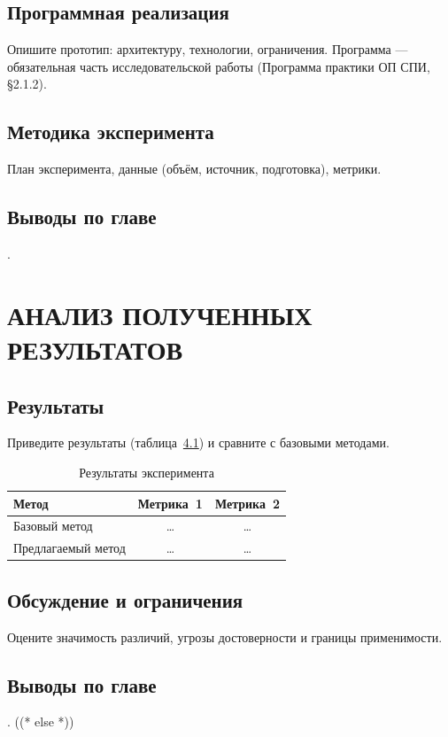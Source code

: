 \documentclass[12pt,a4paper]{extreport}
\begin{document}
\section{Программная реализация}
Опишите прототип: архитектуру, технологии, ограничения. Программа --- обязательная
часть исследовательской работы (Программа практики ОП СПИ, §2.1.2).

\section{Методика эксперимента}
План эксперимента, данные (объём, источник, подготовка), метрики.

\section{Выводы по главе}
.

\clearpage
\chapter{АНАЛИЗ ПОЛУЧЕННЫХ РЕЗУЛЬТАТОВ}
\section{Результаты}
Приведите результаты (таблица~\ref{tab:results}) и сравните с базовыми методами.

\begin{table}[H]
\caption{Результаты эксперимента}
\label{tab:results}
\centering
\begin{tabular}{|>{\raggedright\arraybackslash}p{5cm}|c|c|}
\hline
\textbf{Метод} & \textbf{Метрика~1} & \textbf{Метрика~2} \\
\hline
Базовый метод      & \ldots & \ldots \\
\hline
Предлагаемый метод & \ldots & \ldots \\
\hline
\end{tabular}
\end{table}

\section{Обсуждение и ограничения}
Оцените значимость различий, угрозы достоверности и границы применимости.

\section{Выводы по главе}
.
((* else *))
\clearpage
\end{document}
